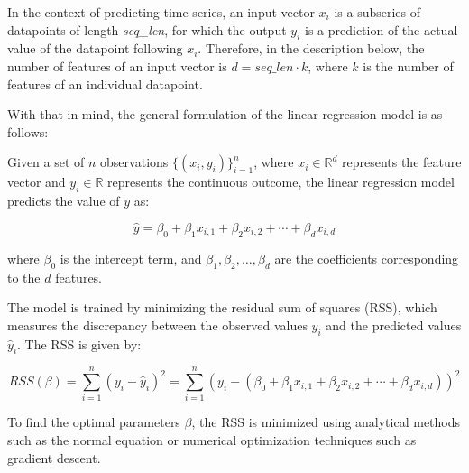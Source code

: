 In the context of predicting time series, an input vector \(x_i\) is a subseries of datapoints of length \textit{seq\_len}, for which the output \(y_i\) is a prediction of the actual value of the datapoint following \(x_i\). Therefore, in the description below, the number of features of an input vector is \(d = \textit{seq\_len} \cdot k\), where \(k\) is the number of features of an individual datapoint.

With that in mind, the general formulation of the linear regression model is as follows:

Given a set of \(n\) observations \(\{(x_i, y_i)\}_{i=1}^n\), where \(x_i \in \mathbb{R}^d\) represents the feature vector and \(y_i \in \mathbb{R}\) represents the continuous outcome, the linear regression model predicts the value of \(y\) as:

\[
	\hat{y} = \beta_0 + \beta_1 x_{i,1} + \beta_2 x_{i,2} + \cdots + \beta_d x_{i,d}
\]

where \(\beta_0\) is the intercept term, and \(\beta_1, \beta_2, \ldots, \beta_d\) are the coefficients corresponding to the \(d\) features.

The model is trained by minimizing the residual sum of squares (RSS), which measures the discrepancy between the observed values \(y_i\) and the predicted values \(\hat{y}_i\). The RSS is given by:

\[
	RSS(\beta) = \sum_{i=1}^n (y_i - \hat{y}_i)^2 = \sum_{i=1}^n \left(y_i - (\beta_0 + \beta_1 x_{i,1} + \beta_2 x_{i,2} + \cdots + \beta_d x_{i,d})\right)^2
\]

To find the optimal parameters \(\beta\), the RSS is minimized using analytical methods such as the normal equation or numerical optimization techniques such as gradient descent.








